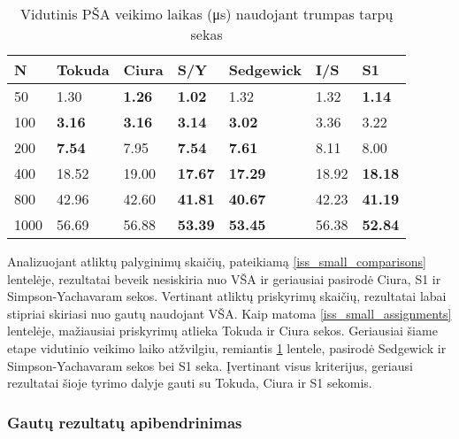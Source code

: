 \documentclass{VUMIFInfKursinis}
\begin{document}
\begin{table}[H]
  \caption{Vidutinis PŠA veikimo laikas (μs) naudojant trumpas tarpų sekas}
  \label{iss_small_runtimes}
  \begin{tabular}{|l|l|l|l|l|l|l|}
  \hline
  N    & Tokuda        & Ciura         & S/Y            & Sedgewick      & I/S   & S1             \\ \hline
  50   & 1.30          & \textbf{1.26} & \textbf{1.02}  & 1.32           & 1.32  & \textbf{1.14}  \\ \hline
  100  & \textbf{3.16} & \textbf{3.16} & \textbf{3.14}  & \textbf{3.02}  & 3.36  & 3.22           \\ \hline
  200  & \textbf{7.54} & 7.95          & \textbf{7.54}  & \textbf{7.61}  & 8.11  & 8.00           \\ \hline
  400  & 18.52         & 19.00         & \textbf{17.67} & \textbf{17.29} & 18.92 & \textbf{18.18} \\ \hline
  800  & 42.96         & 42.60         & \textbf{41.81} & \textbf{40.67} & 42.23 & \textbf{41.19} \\ \hline
  1000 & 56.69         & 56.88         & \textbf{53.39} & \textbf{53.45} & 56.38 & \textbf{52.84} \\ \hline
  \end{tabular}
  \end{table}

Analizuojant atliktų palyginimų skaičių, pateikiamą \ref{iss_small_comparisons} lentelėje, rezultatai beveik nesiskiria nuo VŠA
ir geriausiai pasirodė Ciura, S1 ir Simpson-Yachavaram sekos.
Vertinant atliktų priskyrimų skaičių, rezultatai labai stipriai skiriasi nuo gautų naudojant VŠA.
Kaip matoma \ref{iss_small_assignments} lentelėje, mažiausiai priskyrimų atlieka Tokuda ir Ciura sekos.
Geriausiai šiame etape vidutinio veikimo laiko atžvilgiu, remiantis \ref{iss_small_runtimes} lentele, pasirodė Sedgewick ir Simpson-Yachavaram sekos bei S1 seka.
Įvertinant visus kriterijus, geriausi rezultatai šioje tyrimo dalyje gauti su Tokuda, Ciura ir S1 sekomis.

\subsubsection{Gautų rezultatų apibendrinimas}
\end{document}
